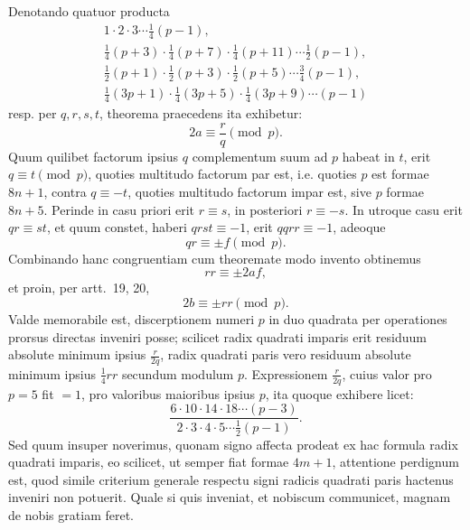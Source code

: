 \documentclass[12pt]{article}
\begin{document}
Denotando quatuor producta
\[
\begin{gathered}
1\cdot2\cdot3\cdots\frac14(p-1),\\
\frac14(p+3)\cdot\frac14(p+7)\cdot\frac14(p+11)\cdots\frac12(p-1),\\
\frac12(p+1)\cdot\frac12(p+3)\cdot\frac12(p+5)\cdots\frac34(p-1),\\
\frac14(3p+1)\cdot\frac14(3p+5)\cdot\frac14(3p+9)\cdots(p-1)
\end{gathered}
\]
resp. per $q,r,s,t$, theorema praecedens ita exhibetur:
\[
2a\equiv \frac{r}{q}\pmod p.
\]
Quum quilibet factorum ipsius $q$ complementum suum ad $p$ habeat in $t$, erit $q\equiv t\pmod p$, quoties multitudo factorum par est, i.e. quoties $p$ est formae $8n+1$, contra $q\equiv -t$, quoties multitudo factorum impar est, sive $p$ formae $8n+5$. Perinde in casu priori erit $r\equiv s$, in posteriori $r\equiv -s$. In utroque casu erit $qr\equiv st$, et quum constet, haberi $qrst\equiv-1$, erit $qqrr\equiv-1$, adeoque
\[
qr\equiv\pm f\pmod p.
\]
Combinando hanc congruentiam cum theoremate modo invento obtinemus
\[
rr\equiv\pm 2af,
\]
et proin, per artt.~19, 20,
\[
2b\equiv \pm rr\pmod p.
\]
Valde memorabile est, discerptionem numeri $p$ in duo quadrata per operationes prorsus directas inveniri posse; scilicet radix quadrati imparis erit residuum absolute minimum ipsius $\frac{r}{2q}$, radix quadrati paris vero residuum absolute minimum ipsius $\frac14 rr$ secundum modulum $p$. Expressionem $\frac{r}{2q}$, cuius valor pro $p=5$ fit $=1$, pro valoribus maioribus ipsius $p$, ita quoque exhibere licet:
\[
\frac{6\cdot10\cdot14\cdot18\cdots(p-3)}
{2\cdot3\cdot4\cdot5\cdots\frac12(p-1)}.
\]
Sed quum insuper noverimus, quonam signo affecta prodeat ex hac formula radix quadrati imparis, eo scilicet, ut semper fiat formae $4m+1$, attentione perdignum est, quod simile criterium generale respectu signi radicis quadrati paris hactenus inveniri non potuerit. Quale si quis inveniat, et nobiscum communicet, magnam de nobis gratiam feret.
\end{document}
